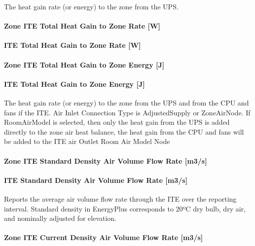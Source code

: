The heat gain rate (or energy) to the zone from the UPS.

\paragraph{Zone ITE Total Heat Gain to Zone Rate {[}W{]}}\label{zone-ite-total-heat-gain-to-zone-rate-w}

\paragraph{ITE Total Heat Gain to Zone Rate {[}W{]}}\label{ite-total-heat-gain-to-zone-rate-w}

\paragraph{Zone ITE Total Heat Gain to Zone Energy {[}J{]}}\label{zone-ite-total-heat-gain-to-zone-energy-j}

\paragraph{ITE Total Heat Gain to Zone Energy {[}J{]}}\label{ite-total-heat-gain-to-zone-energy-j}

The heat gain rate (or energy) to the zone from the UPS and from the CPU and fans if the ITE. Air Inlet Connection Type is AdjustedSupply or ZoneAirNode. If RoomAirModel is selected, then only the heat gain from the UPS is added directly to the zone air heat balance, the heat gain from the CPU and fans will be added to the ITE air Outlet Room Air Model Node

\paragraph{Zone ITE Standard Density Air Volume Flow Rate {[}m3/s{]}}\label{zone-ite-standard-density-air-volume-flow-rate-m3s}

\paragraph{ITE Standard Density Air Volume Flow Rate {[}m3/s{]}}\label{ite-standard-density-air-volume-flow-rate-m3s}

Reports the average air volume flow rate through the ITE over the reporting interval. Standard density in EnergyPlus corresponds to 20ºC dry bulb, dry air, and nominally adjusted for elevation.

\paragraph{Zone ITE Current Density Air Volume Flow Rate {[}m3/s{]}}\label{zone-ite-current-density-air-volume-flow-rate-m3s}

